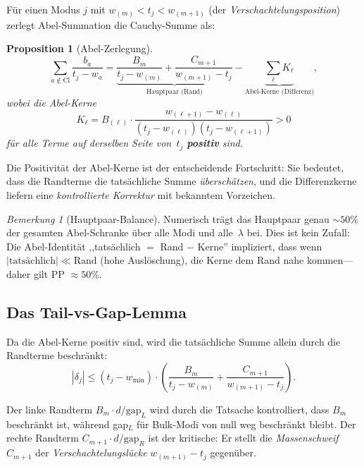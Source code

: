\documentclass[12pt,a4paper]{article}
\newtheorem{proposition}[theorem]{Proposition}
\theoremstyle{definition}
\theoremstyle{remark}
\newtheorem{remark}[theorem]{Bemerkung}
\newcommand{\Cl}{\mathrm{Cl}}
\newcommand{\wmin}{w_{\min}}
\begin{document}
Für einen Modus $j$ mit $w_{(m)} < t_j < w_{(m+1)}$ (der \emph{Verschachtelungsposition})
zerlegt Abel-Summation die Cauchy-Summe als:

\begin{proposition}[Abel-Zerlegung]
\label{prop:abel}
\begin{equation}
\label{eq:abel}
\sum_{a \notin \Cl} \frac{b_a}{t_j - w_a}
= \underbrace{\frac{B_m}{t_j - w_{(m)}} + \frac{C_{m+1}}{w_{(m+1)} - t_j}}_{\text{Hauptpaar (Rand)}}
- \underbrace{\sum_{\ell} K_\ell}_{\text{Abel-Kerne (Differenz)}},
\end{equation}
wobei die Abel-Kerne
\begin{equation}
K_\ell = B_{(\ell)} \cdot \frac{w_{(\ell+1)} - w_{(\ell)}}{(t_j - w_{(\ell)})(t_j - w_{(\ell+1)})} > 0
\end{equation}
für alle Terme auf derselben Seite von~$t_j$ \textbf{positiv} sind.
\end{proposition}

Die Positivität der Abel-Kerne ist der entscheidende Fortschritt:
Sie bedeutet, dass die Randterme die tatsächliche Summe \emph{überschätzen},
und die Differenzkerne liefern eine \emph{kontrollierte Korrektur}
mit bekanntem Vorzeichen.

\begin{remark}[Hauptpaar-Balance]
Numerisch trägt das Hauptpaar genau $\sim 50\%$
der gesamten Abel-Schranke über alle Modi und alle~$\lambda$ bei.
Dies ist kein Zufall: Die Abel-Identität
,,tatsächlich $=$ Rand $-$ Kerne'' impliziert, dass wenn $|\text{tatsächlich}|
\ll \text{Rand}$ (hohe Auslöschung), die Kerne dem Rand nahe kommen---daher
gilt PP $\approx 50\%$.
\end{remark}

\subsection{Das Tail-vs-Gap-Lemma}

Da die Abel-Kerne positiv sind, wird die tatsächliche Summe allein durch
die Randterme beschränkt:
\begin{equation}
|\delta_j| \leq (t_j - \wmin) \cdot
\left(\frac{B_m}{t_j - w_{(m)}} + \frac{C_{m+1}}{w_{(m+1)} - t_j}\right).
\end{equation}

Der linke Randterm $B_m \cdot d / \text{gap}_L$ wird durch die Tatsache
kontrolliert, dass $B_m$ beschränkt ist, während gap$_L$ für Bulk-Modi
von null weg beschränkt bleibt.
Der rechte Randterm $C_{m+1} \cdot d / \text{gap}_R$ ist der
kritische: Er stellt die \emph{Massenschweif} $C_{m+1}$ der
\emph{Verschachtelungslücke} $w_{(m+1)} - t_j$ gegenüber.
\end{document}
